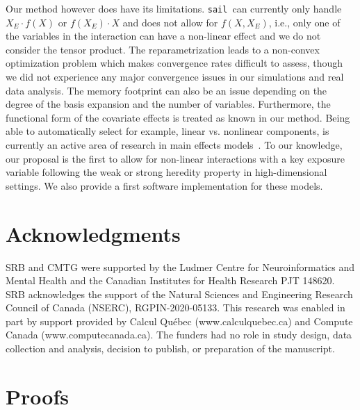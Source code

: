 \documentclass[a4paper,fleqn]{cas-sc}
\newcommand{\sail}{\texttt{sail}}
\begin{document}
Our method however does have its limitations. \sail ~can currently only handle $X_E \cdot f(X)$ or $f(X_E) \cdot X$ and does not allow for $f(X, X_E)$, i.e., only one of the variables in the interaction can have a non-linear effect and we do not consider the tensor product. 
The reparametrization leads to a non-convex optimization problem which makes convergence rates difficult to assess, though we did not experience any major convergence issues in our simulations and real data analysis. 
The memory footprint can also be an issue depending on the degree of the basis expansion and the number of variables. 
Furthermore, the functional form of the covariate effects is treated as known in our method. 
Being able to automatically select for example, linear vs. nonlinear components, is currently an active area of research in main effects models~\citep{haris2016nonparametric}.
To our knowledge, our proposal is the first to allow for non-linear interactions with a key exposure variable following the weak or strong heredity property in high-dimensional settings. 
We also provide a first software implementation for these models.


\section*{Acknowledgments}

SRB and CMTG were supported by the Ludmer Centre for Neuroinformatics and Mental Health and the Canadian Institutes for Health Research PJT 148620. SRB acknowledges the support of the Natural Sciences and Engineering Research Council of Canada (NSERC), RGPIN-2020-05133.
This research was enabled in part by support provided by Calcul Québec (www.calculquebec.ca) and Compute Canada
(www.computecanada.ca). The funders had no role in study design, data collection and analysis, decision to publish, or preparation of the manuscript.



%




\newpage

\appendix

\section{Proofs} \label{ap:proofs}
\end{document}
